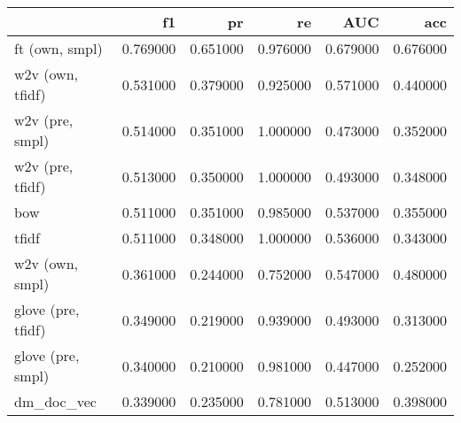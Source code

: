 \begin{tabular}{lrrrrr}
\toprule
 & f1 & pr & re & AUC & acc \\
\midrule
ft (own, smpl) & 0.769000 & 0.651000 & 0.976000 & 0.679000 & 0.676000 \\
w2v (own, tfidf) & 0.531000 & 0.379000 & 0.925000 & 0.571000 & 0.440000 \\
w2v (pre, smpl) & 0.514000 & 0.351000 & 1.000000 & 0.473000 & 0.352000 \\
w2v (pre, tfidf) & 0.513000 & 0.350000 & 1.000000 & 0.493000 & 0.348000 \\
bow & 0.511000 & 0.351000 & 0.985000 & 0.537000 & 0.355000 \\
tfidf & 0.511000 & 0.348000 & 1.000000 & 0.536000 & 0.343000 \\
w2v (own, smpl) & 0.361000 & 0.244000 & 0.752000 & 0.547000 & 0.480000 \\
glove (pre, tfidf) & 0.349000 & 0.219000 & 0.939000 & 0.493000 & 0.313000 \\
glove (pre, smpl) & 0.340000 & 0.210000 & 0.981000 & 0.447000 & 0.252000 \\
dm_doc_vec & 0.339000 & 0.235000 & 0.781000 & 0.513000 & 0.398000 \\
\bottomrule
\end{tabular}
